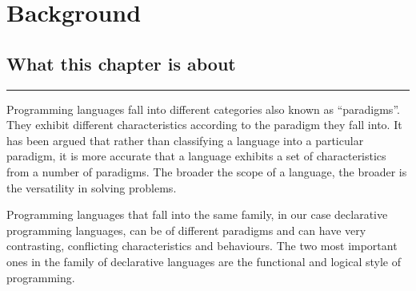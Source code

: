 \documentclass[thesis-solanki.tex]{subfiles}
\begin{document}
\chapter{Background}\label{chap:background}

\section{What this chapter is about}

\noindent\rule{\textwidth}{0.5pt}

Programming languages fall into different categories also known as ``paradigms''.
They exhibit different characteristics according to the paradigm they fall into.
It has been argued \cite{Krishnamurthi:2008:TPL:1480828.1480846} that rather than classifying a language into a
particular paradigm, it is more accurate that a language exhibits a set of characteristics from a number of
paradigms.
The broader the scope of a language, the broader is the versatility in solving problems.

Programming languages that fall into the same family, in our case declarative programming languages, can be of
different paradigms and can have very contrasting, conflicting characteristics and behaviours.
The two most important ones in the family of declarative languages are the functional and
logical style of programming.
\end{document}
